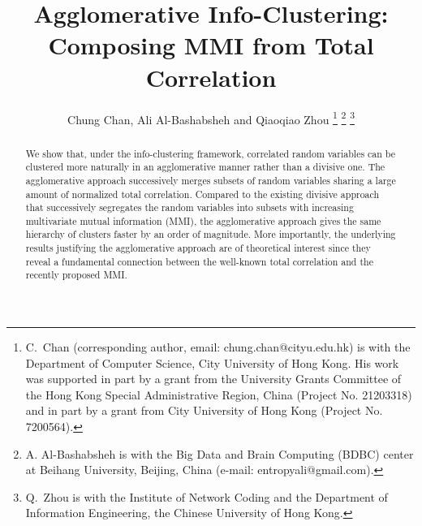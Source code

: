 \documentclass[letterpaper,onecolumn,draftcls]{IEEEtran}
\title{Agglomerative Info-Clustering:\\ Composing MMI from Total Correlation}
\author{Chung Chan, Ali Al-Bashabsheh and Qiaoqiao Zhou
	\thanks{C.\ Chan (corresponding author, email:
          chung.chan@cityu.edu.hk) is with the Department of Computer Science, City University of Hong Kong. His work was supported in part by a grant
          from the University Grants Committee of the Hong Kong Special Administrative Region,
          China (Project No. 21203318) and in part by a grant from
          City University of Hong Kong (Project No. 7200564).}
        \thanks{A. Al-Bashabsheh is with the Big Data and Brain
          Computing (BDBC) center at Beihang University, Beijing, China (e-mail:
          entropyali@gmail.com).}
        \thanks{Q.\ Zhou is with the Institute of Network Coding and the Department of Information Engineering, the Chinese University of Hong Kong.
	}
	}
\begin{document}

%
\IEEEoverridecommandlockouts
\maketitle

\begin{abstract}
We show that, under the info-clustering framework, correlated random variables can be clustered more naturally in an agglomerative manner rather than a divisive one. The agglomerative approach successively merges subsets of random variables sharing a large amount of normalized total correlation. Compared to the existing divisive approach that successively segregates the random variables into subsets with increasing multivariate mutual information (MMI), the agglomerative approach gives the same hierarchy of clusters faster by an order of magnitude.  More importantly, the underlying results justifying the agglomerative approach are of theoretical interest since they reveal a fundamental connection between the well-known total correlation and the recently proposed MMI. %
\end{abstract} 






\end{document}
